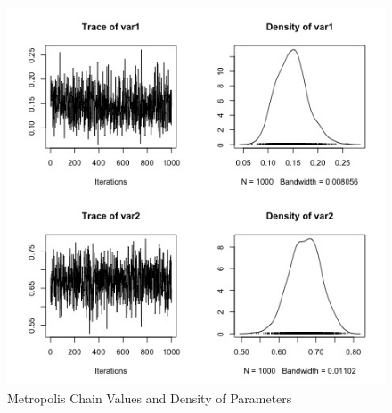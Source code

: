 \documentclass[11pt,a4paper]{article}
\begin{document}
\begin{figure}[h!]
  \includegraphics[scale=0.33]{images/metropolis_0_100.jpg}
  \caption{Metropolis Chain Values and Density of Parameters}
  \label{fig:birds}
\end{figure}
\end{document}
